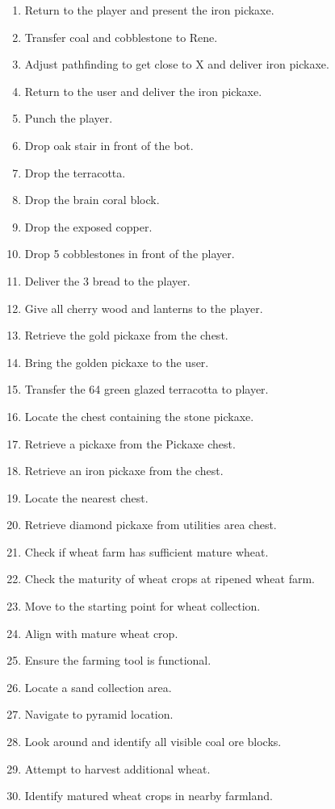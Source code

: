 \begin{small}
\begin{enumerate}
  \item Return to the player and present the iron pickaxe.
  \item Transfer coal and cobblestone to Rene.
  \item Adjust pathfinding to get close to X and deliver iron pickaxe.
  \item Return to the user and deliver the iron pickaxe.
  \item Punch the player.
  \item Drop oak stair in front of the bot.
  \item Drop the terracotta.
  \item Drop the brain coral block.
  \item Drop the exposed copper.
  \item Drop 5 cobblestones in front of the player.
  \item Deliver the 3 bread to the player.
  \item Give all cherry wood and lanterns to the player.
  \item Retrieve the gold pickaxe from the chest.
  \item Bring the golden pickaxe to the user.
  \item Transfer the 64 green glazed terracotta to player.
  \item Locate the chest containing the stone pickaxe.
  \item Retrieve a pickaxe from the Pickaxe chest.
  \item Retrieve an iron pickaxe from the chest.
  \item Locate the nearest chest.
  \item Retrieve diamond pickaxe from utilities area chest.
  \item Check if wheat farm has sufficient mature wheat.
  \item Check the maturity of wheat crops at ripened wheat farm.
  \item Move to the starting point for wheat collection.
  \item Align with mature wheat crop.
  \item Ensure the farming tool is functional.
  \item Locate a sand collection area.
  \item Navigate to pyramid location.
  \item Look around and identify all visible coal ore blocks.
  \item Attempt to harvest additional wheat.
  \item Identify matured wheat crops in nearby farmland.

\end{enumerate}
\end{small}
